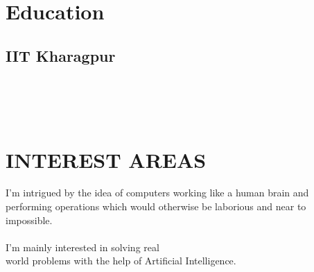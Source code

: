 \documentclass[]{deedy-resume-openfont}
\begin{document}
%
%

%
%

\begin{minipage}[t]{0.33\textwidth} 


\section{Education} 

\subsection{IIT Kharagpur}
\sectionsep
\\~\\~\\

\section{INTEREST AREAS}
I’m intrigued by the idea of computers working like a human brain and \\ performing operations which would otherwise be laborious and near to impossible. \\~\\
I’m mainly interested in solving real \\ world problems with the help of Artificial Intelligence.
\sectionsep
\\~\\~\\



\end{minipage}
\end{document}

